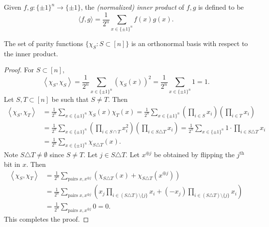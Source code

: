 \documentclass[letterpaper, reqno,11pt]{article}
\begin{document}
\begin{definition}
  Given $f, g : \{ \pm 1 \}^n \to \{ \pm 1 \}$, the \emph{(normalized) inner product} of $f, g$ is defined to be
  $$ \langle f, g \rangle = \frac{1}{2^n} \sum_{x \in \{ \pm 1 \}^n} f(x) g(x). $$
\end{definition}

\begin{proposition}
  The set of parity functions $\{ \chi_S : S \subset [n] \}$ is an orthonormal basis with respect to the inner product.
\end{proposition}

\begin{proof}
  For $S \subset [n]$,
  $$ \left\langle \chi_S, \chi_S \right\rangle = \frac{1}{2^n} \sum_{x \in \{ \pm 1 \}^n} \left(\chi_S(x)\right)^2 = \frac{1}{2^n} \sum_{x \in \{ \pm 1 \}^n} 1 = 1. $$
  Let $S, T \subset [n]$ be such that $S \neq T$. Then
  \begin{align*}
    \left\langle \chi_S, \chi_T \right\rangle &= \frac{1}{2^n} \sum_{x \in \{ \pm 1 \}^n} \chi_S(x) \chi_T(x) = \frac{1}{2^n} \sum_{x \in \{ \pm 1 \}^n} \left(\prod_{i \in S} x_i\right) \left(\prod_{i \in T} x_i\right) \\
    &= \frac{1}{2^n} \sum_{x \in \{ \pm 1 \}^n} \left(\prod_{i \in S \cap T} x_i^2\right) \left(\prod_{i \in S \triangle T} x_i\right) = \frac{1}{2^n} \sum_{x \in \{ \pm 1 \}^n} 1 \cdot \prod_{i \in S \triangle T} x_i \\
    &= \frac{1}{2^n} \sum_{x \in \{ \pm 1 \}^n} \chi_{S \triangle T}(x).
  \end{align*}
  Note $S \triangle T \neq \emptyset$ since $S \neq T$. Let $j \in S \triangle T$. Let $x^{\oplus j}$ be obtained by flipping the $j^\text{th}$ bit in $x$. Then
  \begin{align}
    \left\langle \chi_S, \chi_T \right\rangle &= \frac{1}{2^n} \sum_{\text{pairs $x, x^{\oplus j}$}} \left(\chi_{S \triangle T}(x) + \chi_{S \triangle T}\left(x^{\oplus j}\right)\right) \nonumber \\
    &= \frac{1}{2^n} \sum_{\text{pairs $x, x^{\oplus j}$}} \left(x_j\prod_{i \in (S \triangle T) \setminus \{ j \}} x_i + \left(-x_j\right)\prod_{i \in (S \triangle T) \setminus \{ j \}} x_i\right) \nonumber \\
    &= \frac{1}{2^n} \sum_{\text{pairs $x, x^{\oplus j}$}} 0 = 0. \label{eq:zero}
  \end{align}
  This completes the proof.
\end{proof}
\end{document}
